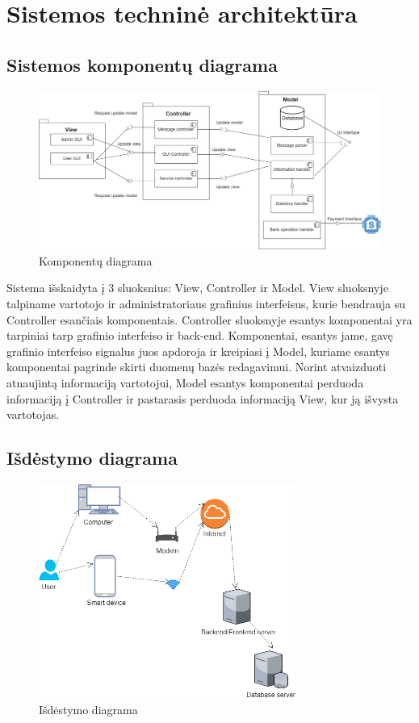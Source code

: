 \documentclass[oneside]{VUMIFPSkursinis}
\begin{document}
\section{Sistemos techninė architektūra}
	\subsection{Sistemos komponentų diagrama}
			\begin{figure}[h]
    				\centering
    				\includegraphics[width=1\textwidth]{KomponentuDiagrama.png}
    				\caption{Komponentų diagrama}
    				\label{fig:Komponentų diagrama}
			\end{figure}

	Sistema išskaidyta į 3 sluoksnius: View, Controller ir Model. View sluoksnyje talpiname vartotojo ir administratoriaus grafinius interfeisus, kurie bendrauja su Controller esančiais komponentais. Controller sluoksnyje esantys komponentai yra tarpiniai tarp grafinio interfeiso ir back-end. Komponentai, esantys jame, gavę grafinio interfeiso signalus juos apdoroja ir kreipiasi į Model, kuriame esantys komponentai pagrinde skirti duomenų bazės redagavimui. Norint atvaizduoti atnaujintą informaciją vartotojui, Model esantys komponentai perduoda informaciją į Controller ir pastarasis perduoda informaciją View, kur ją išvysta vartotojas.
	\pagebreak
	\subsection{Išdėstymo diagrama}
			\begin{figure}[h]
    				\centering
    				\includegraphics[width=0.75\textwidth]{Deployment.png}
    				\caption{Išdėstymo diagrama}
			\end{figure}
\end{document}
